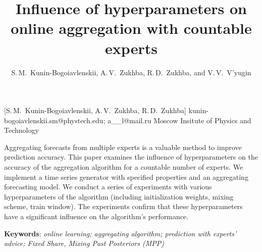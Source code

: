 \documentclass[12pt, twoside]{article}
\begin{document}
\English

\title
    [] %
    {Influence of hyperparameters on online aggregation with countable experts} %
\author
    [S.\,M.~Kunin-Bogoiavlenskii] %
    {S.\,M.~Kunin-Bogoiavlenskii, A.\,V.~Zukhba, R.\,D.~Zukhba, and V.\,V.~V’yugin} %
    [S.\,M.~Kunin-Bogoiavlenskii, A.\,V.~Zukhba, R.\,D.~Zukhba] %
\email
    {kunin-bogoiavlenskii.sm@phystech.edu; a\_\_l@mail.ru}
\organization
    {Moscow Insitute of Physics and Technology}
\abstract
    {

    Aggregating forecasts from multiple experts is a valuable method to improve prediction accuracy.
    This paper examines the influence of hyperparameters on the accuracy of the aggregation algorithm for a countable number of experts.
    We implement a time series generator with specified properties and an aggregating forecasting model. 
    We conduct a series of experiments with various hyperparameters of the algorithm (including initialization weights, mixing scheme, train window). 
    The experiments confirm that these hyperparameters have a significant influence on the algorithm's performance.           
        
%   
%   
%   
%               
    \noindent
        \textbf{Keywords}: \emph{online learning; aggregating algorithm; prediction with experts’ advice; Fixed Share, Mixing Past Posteriors (MPP)}}

\end{document}
